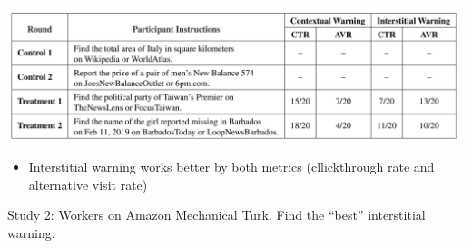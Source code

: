 \documentclass[aspectratio=169]{beamer}
\begin{document}
\begin{frame}

\begin{center}
\includegraphics[width=\textwidth]{figures/kaiser_adapting_2020_tab1}
\end{center}

\begin{itemize}
\item Interstitial warning works better by both metrics (cllickthrough rate and alternative visit rate)
\end{itemize}

\end{frame}
\begin{frame}

Study 2: Workers on Amazon Mechanical Turk. Find the ``best'' interstitial warning.

\setcounter{subfigure}{0}
\begin{figure}
  \centering
  \hspace{0in}
\end{figure}
\end{frame}
\end{document}
